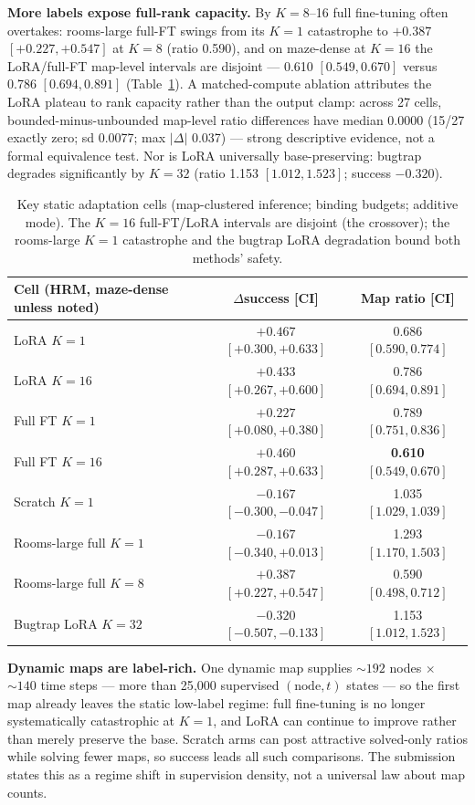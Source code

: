 \documentclass[11pt,letterpaper]{article}
\begin{document}
\textbf{More labels expose full-rank capacity.} By $K{=}8$--16 full fine-tuning often overtakes: rooms-large full-FT swings from its $K{=}1$ catastrophe to $+0.387$ $[+0.227,+0.547]$ at $K{=}8$ (ratio 0.590), and on maze-dense at $K{=}16$ the LoRA/full-FT map-level intervals are disjoint --- 0.610 $[0.549,0.670]$ versus 0.786 $[0.694,0.891]$ (Table~\ref{tab:c9cells}). A matched-compute ablation attributes the LoRA plateau to rank capacity rather than the output clamp: across 27 cells, bounded-minus-unbounded map-level ratio differences have median 0.0000 (15/27 exactly zero; sd 0.0077; max $|\Delta|$ 0.037) --- strong descriptive evidence, not a formal equivalence test. Nor is LoRA universally base-preserving: bugtrap degrades significantly by $K{=}32$ (ratio 1.153 $[1.012,1.523]$; success $-0.320$).

\begin{table}[t]
\centering
\small
\begin{tabular}{lcc}
\toprule
Cell (HRM, maze-dense unless noted) & $\Delta$success [CI] & Map ratio [CI] \\
\midrule
LoRA $K{=}1$        & $+0.467$ $[+0.300,+0.633]$ & 0.686 $[0.590,0.774]$ \\
LoRA $K{=}16$       & $+0.433$ $[+0.267,+0.600]$ & 0.786 $[0.694,0.891]$ \\
Full FT $K{=}1$     & $+0.227$ $[+0.080,+0.380]$ & 0.789 $[0.751,0.836]$ \\
Full FT $K{=}16$    & $+0.460$ $[+0.287,+0.633]$ & \textbf{0.610} $[0.549,0.670]$ \\
Scratch $K{=}1$     & $-0.167$ $[-0.300,-0.047]$ & 1.035 $[1.029,1.039]$ \\
Rooms-large full $K{=}1$ & $-0.167$ $[-0.340,+0.013]$ & 1.293 $[1.170,1.503]$ \\
Rooms-large full $K{=}8$ & $+0.387$ $[+0.227,+0.547]$ & 0.590 $[0.498,0.712]$ \\
Bugtrap LoRA $K{=}32$    & $-0.320$ $[-0.507,-0.133]$ & 1.153 $[1.012,1.523]$ \\
\bottomrule
\end{tabular}
\caption{Key static adaptation cells (map-clustered inference; binding budgets; additive mode). The $K{=}16$ full-FT/LoRA intervals are disjoint (the crossover); the rooms-large $K{=}1$ catastrophe and the bugtrap LoRA degradation bound both methods' safety.}
\label{tab:c9cells}
\end{table}

\textbf{Dynamic maps are label-rich.} One dynamic map supplies ${\sim}192$ nodes $\times$ ${\sim}140$ time steps --- more than 25{,}000 supervised $(\text{node},t)$ states --- so the first map already leaves the static low-label regime: full fine-tuning is no longer systematically catastrophic at $K{=}1$, and LoRA can continue to improve rather than merely preserve the base. Scratch arms can post attractive solved-only ratios while solving fewer maps, so success leads all such comparisons. The submission states this as a regime shift in supervision density, not a universal law about map counts.
\end{document}
